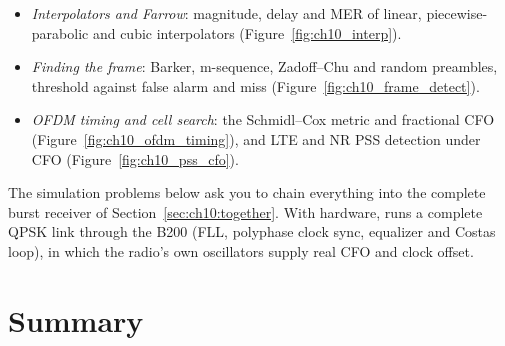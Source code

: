 \begin{labbox}
\begin{itemize}
(Figure~\ref{fig:ch10_timing_tighten}).
\item \emph{Interpolators and Farrow}: magnitude, delay and MER of linear, piecewise-parabolic and
cubic interpolators (Figure~\ref{fig:ch10_interp}).
\item \emph{Finding the frame}: Barker, m-sequence, Zadoff--Chu and random preambles, threshold against
false alarm and miss (Figure~\ref{fig:ch10_frame_detect}).
\item \emph{OFDM timing and cell search}: the Schmidl--Cox metric and fractional CFO
(Figure~\ref{fig:ch10_ofdm_timing}), and LTE and NR PSS detection under CFO
(Figure~\ref{fig:ch10_pss_cfo}).
\end{itemize}
The simulation problems below ask you to chain everything into the complete burst receiver of
Section~\ref{sec:ch10:together}. With hardware,  runs a complete
QPSK link through the B200 (FLL, polyphase clock sync, equalizer and Costas loop), in which the
radio's own oscillators supply real CFO and clock offset.
\end{labbox}

\section*{Summary}

